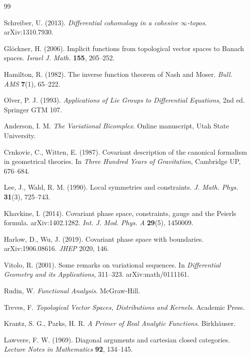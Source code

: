 \documentclass[12pt,letterpaper]{article}
\theoremstyle{definition}
\begin{document}

\begin{thebibliography}{99}

Schreiber, U. (2013). \emph{Differential cohomology in a cohesive $\infty$-topos}. arXiv:1310.7930.

Gl\"ockner, H. (2006). Implicit functions from topological vector spaces to Banach spaces. \emph{Israel J. Math.} \textbf{155}, 205--252.

Hamilton, R. (1982). The inverse function theorem of Nash and Moser. \emph{Bull. AMS} \textbf{7}(1), 65--222.

Olver, P. J. (1993). \emph{Applications of Lie Groups to Differential Equations}, 2nd ed. Springer GTM 107.

Anderson, I. M. \emph{The Variational Bicomplex}. Online manuscript, Utah State University.

Crnkovic, C., Witten, E. (1987). Covariant description of the canonical formalism in geometrical theories. In \emph{Three Hundred Years of Gravitation}, Cambridge UP, 676--684.

Lee, J., Wald, R. M. (1990). Local symmetries and constraints. \emph{J. Math. Phys.} \textbf{31}(3), 725--743.

Khavkine, I. (2014). Covariant phase space, constraints, gauge and the Peierls formula. arXiv:1402.1282. \emph{Int. J. Mod. Phys. A} \textbf{29}(5), 1450009.

Harlow, D., Wu, J. (2019). Covariant phase space with boundaries. arXiv:1906.08616. \emph{JHEP} 2020, 146.

Vitolo, R. (2001). Some remarks on variational sequences. In \emph{Differential Geometry and its Applications}, 311--323. arXiv:math/0111161.

Rudin, W. \emph{Functional Analysis}. McGraw-Hill.

Treves, F. \emph{Topological Vector Spaces, Distributions and Kernels}. Academic Press.

Krantz, S. G., Parks, H. R. \emph{A Primer of Real Analytic Functions}. Birkh\"auser.

Lawvere, F. W. (1969). Diagonal arguments and cartesian closed categories. \emph{Lecture Notes in Mathematics} \textbf{92}, 134--145.


\end{thebibliography}
\end{document}
